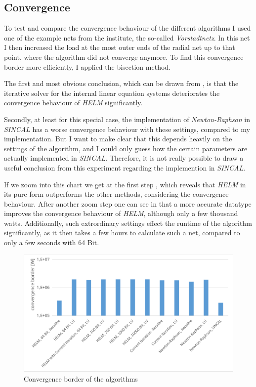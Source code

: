 \subsection{Convergence}

To test and compare the convergence behaviour of the different algorithms I used one of the example nets from the institute, the so-called \emph{Vorstadtnetz}. In this net I then increased the load at the most outer ends of the radial net up to that point, where the algorithm did not converge anymore. To find this convergence border more efficiently, I applied the bisection method.

The first and most obvious conclusion, which can be drawn from , is that the iterative solver for the internal linear equation systems deteriorates the convergence behaviour of \emph{HELM} significantly. 

Secondly, at least for this special case, the implementation of \emph{Newton-Raphson} in \emph{SINCAL} has a worse convergence behaviour with these settings, compared to my implementation. But I want to make clear that this depends heavily on the settings of the algorithm, and I could only guess how the certain parameters are actually implemented in \emph{SINCAL}. Therefore, it is not really possible to draw a useful conclusion from this experiment regarding the implemention in \emph{SINCAL}.

If we zoom into this chart we get at the first step , which reveals that \emph{HELM} in its pure form outperforms the other methods, considering the convergence behaviour. After another zoom step one can see in  that a more accurate datatype improves the convergence behaviour of \emph{HELM}, although only a few thousand watts. Additionally, such extrordinary settings effect the runtime of the algorithm significantly, as it then takes a few hours to calculate such a net, compared to only a few seconds with 64 Bit.

\begin{figure}
	\centering
	\includegraphics[scale=0.7]{figures/convergence_border_vorstadtnetz_1}
	\caption[Comparison, convergence]{Convergence border of the algorithms}
	\label{fig:comparison_convergence_border_1}
\end{figure}

